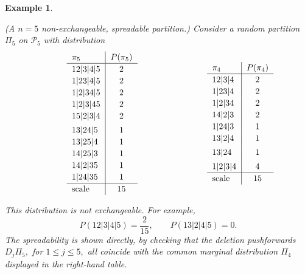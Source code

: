 \documentclass{article}
\newtheorem{example}{Example}
\begin{document}
\begin{example}\label{Ex1}
{\rm 
(A $n=5$ non-exchangeable, spreadable partition.)
Consider a random partition $\Pi_5$ on $\mathcal{P}_5$ with distribution
\[
\begin{minipage}[t]{0.56\textwidth}
\centering
\renewcommand{\arraystretch}{1.15}
\begin{tabular}{l|c}
$\pi_5$ & $P(\pi_5)$ \\
\hline
$12|3|4|5$ & 2 \\
$1|23|4|5$ & 2 \\
$1|2|34|5$ & 2 \\
$1|2|3|45$ & 2 \\
$15|2|3|4$ & 2 \\[1mm]
$13|24|5$ & 1 \\
$13|25|4$ & 1 \\
$14|25|3$ & 1 \\
$14|2|35$ & 1 \\
$1|24|35$ & 1 \\
\hline
scale & 15
\end{tabular}
\end{minipage}
\hfill
\begin{minipage}[t]{0.38\textwidth}
\centering
\renewcommand{\arraystretch}{1.15}
\begin{tabular}{l|c}
$\pi_4$ & $P(\pi_4)$ \\
\hline
$12|3|4$ & 2 \\
$1|23|4$ & 2 \\
$1|2|34$ & 2 \\
$14|2|3$ & 2 \\
$1|24|3$ & 1 \\
$13|2|4$ & 1 \\[1mm]
$13|24$ & 1 \\[1mm]
$1|2|3|4$ & 4 \\
\hline
scale & 15
\end{tabular}
\end{minipage}
\]




























This distribution is not exchangeable. For example,
\[
P(12|3|4|5)=\frac{2}{15},
\qquad
P(13|2|4|5)=0.
\]
The spreadability is shown directly, by
 checking that the deletion pushforwards $D_j\Pi_5,$ for $1\leq j\leq5,$
all coincide with the common marginal distribution $\Pi_4$
displayed in the right-hand table. 
}
\end{example}
\end{document}
